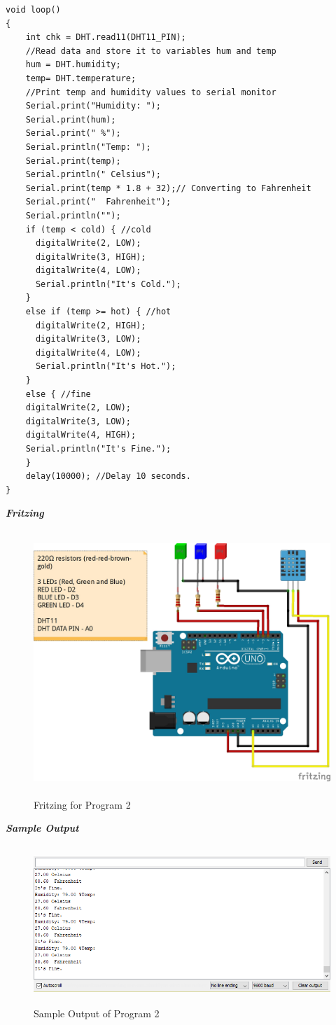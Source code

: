 \documentclass[12pt,a4paper]{article}
\begin{document}
\begin{flushleft}
\begin{lstlisting}
void loop()
{
    int chk = DHT.read11(DHT11_PIN);
    //Read data and store it to variables hum and temp
    hum = DHT.humidity;
    temp= DHT.temperature;
    //Print temp and humidity values to serial monitor
    Serial.print("Humidity: ");
    Serial.print(hum);
    Serial.print(" %");
    Serial.println("Temp: ");
    Serial.print(temp);
    Serial.println(" Celsius");
    Serial.print(temp * 1.8 + 32);// Converting to Fahrenheit
    Serial.print("  Fahrenheit");
    Serial.println("");
    if (temp < cold) { //cold
      digitalWrite(2, LOW);
      digitalWrite(3, HIGH);
      digitalWrite(4, LOW);
      Serial.println("It's Cold.");
    }
    else if (temp >= hot) { //hot
      digitalWrite(2, HIGH);
      digitalWrite(3, LOW);
      digitalWrite(4, LOW);
      Serial.println("It's Hot.");
    }
    else { //fine
    digitalWrite(2, LOW);
    digitalWrite(3, LOW);
    digitalWrite(4, HIGH);
    Serial.println("It's Fine.");
    }
    delay(10000); //Delay 10 seconds.
}
\end{lstlisting}
\textbf{\textit{Fritzing}} \\
\begin{figure}[h!]
    \centering
	\includegraphics[width=12cm, height=10cm]{Prog2.jpg}
	\caption{Fritzing for Program 2}
\end{figure}

\textbf{\textit{Sample Output}} \\

\begin{figure}[h!]
    \centering
	\includegraphics[width=12cm, height=6cm]{Lab2_Output.png}
	\caption{Sample Output of Program 2}
\end{figure}
\end{flushleft}\vspace{6.5cm}
\end{document}
